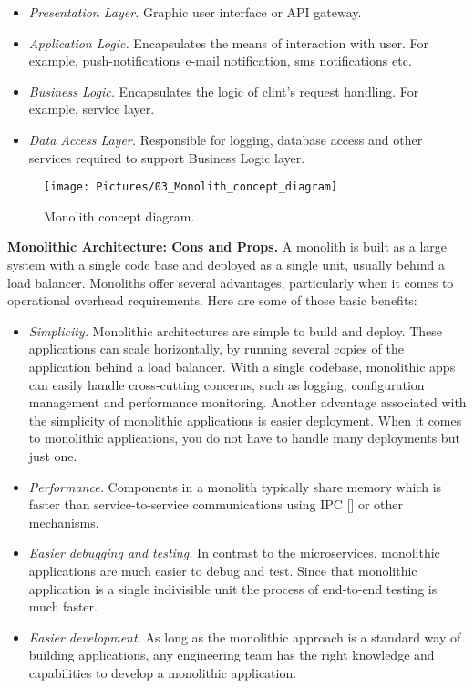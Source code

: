 \begin{itemize}
    \item \textit{Presentation Layer.} Graphic user interface or API gateway.
    \item \textit{Application Logic.} Encapsulates the means of interaction with user.
    For example, push-notifications e-mail notification, sms notifications etc.
    \item \textit{Business Logic.} Encapsulates the logic of clint's request handling.
    For example, service layer.
    \item \textit{Data Access Layer.} Responsible for logging, database access and other services required to support
    Business Logic layer.
\end{itemize}

\begin{figure}[H]
    \centering
    \texttt{[image: Pictures/03\_Monolith\_concept\_diagram]}
    \caption{Monolith concept diagram.}\label{fig:figure2}
\end{figure}

\textbf{Monolithic Architecture: Cons and Props.} A monolith is built as a large system with a single code base and
deployed as a single unit, usually behind a load balancer.
Monoliths offer several advantages, particularly when it comes to operational overhead requirements.
Here are some of those basic benefits:

\begin{itemize}
    \item \textit{Simplicity.} Monolithic architectures are simple to build and deploy.
    These applications can scale horizontally, by running several copies of the application behind a load balancer.
    With a single codebase, monolithic apps can easily handle cross-cutting concerns, such as logging,
    configuration management and performance monitoring.
    Another advantage associated with the simplicity of monolithic applications is easier deployment.
    When it comes to monolithic applications, you do not have to handle many deployments but just one.
    \item \textit{Performance.} Components in a monolith typically share memory which is faster than service-to-service
    communications using IPC [\cite{proctor1999linux}] or other mechanisms.
    \item \textit{Easier debugging and testing.}
    In contrast to the microservices, monolithic applications are much easier to debug and test.
    Since that monolithic application is a single indivisible unit the process of end-to-end testing is much faster.
    \item \textit{Easier development.} As long as the monolithic approach is a standard way of building applications,
    any engineering team has the right knowledge and capabilities to develop a monolithic application.
\end{itemize}

